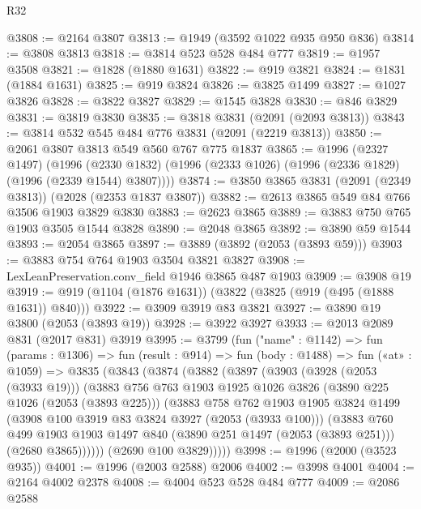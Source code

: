 \begin{lexlean}{R32}
\begin{coremodule}
@3808 := @2164 @3807
@3813 := @1949 (@3592 @1022 @935 @950 @836)
@3814 := @3808 @3813
@3818 := @3814 @523 @528 @484 @777
@3819 := @1957 @3508
@3821 := @1828 (@1880 @1631)
@3822 := @919 @3821
@3824 := @1831 (@1884 @1631)
@3825 := @919 @3824
@3826 := @3825 @1499
@3827 := @1027 @3826
@3828 := @3822 @3827
@3829 := @1545 @3828
@3830 := @846 @3829
@3831 := @3819 @3830
@3835 := @3818 @3831 (@2091 (@2093 @3813))
@3843 := @3814 @532 @545 @484 @776 @3831 (@2091 (@2219 @3813))
@3850 := @2061 @3807 @3813 @549 @560 @767 @775 @1837
@3865 := @1996
    (@2327 @1497)
    (@1996 (@2330 @1832) (@1996 (@2333 @1026) (@1996 (@2336 @1829) (@1996 (@2339 @1544) @3807))))
@3874 := @3850 @3865 @3831 (@2091 (@2349 @3813)) (@2028 (@2353 @1837 @3807))
@3882 := @2613 @3865 @549 @84 @766 @3506 @1903 @3829 @3830
@3883 := @2623 @3865
@3889 := @3883 @750 @765 @1903 @3505 @1544 @3828
@3890 := @2048 @3865
@3892 := @3890 @59 @1544
@3893 := @2054 @3865
@3897 := @3889 (@3892 (@2053 (@3893 @59)))
@3903 := @3883 @754 @764 @1903 @3504 @3821 @3827
@3908 := LexLeanPreservation.conv_field @1946 @3865 @487 @1903
@3909 := @3908 @19
@3919 := @919 (@1104 (@1876 @1631)) (@3822 (@3825 (@919 (@495 (@1888 @1631)) @840)))
@3922 := @3909 @3919 @83 @3821
@3927 := @3890 @19 @3800 (@2053 (@3893 @19))
@3928 := @3922 @3927
@3933 := @2013 @2089 @831 (@2017 @831) @3919
@3995 := @3799
    (fun ("name" : @1142) =>
    fun (params : @1306) =>
    fun (result : @914) =>
    fun (body : @1488) =>
    fun («at» : @1059) =>
    @3835
      (@3843
        (@3874
          (@3882
            (@3897
              (@3903
                (@3928 (@2053 (@3933 @19)))
                (@3883
                  @756
                  @763
                  @1903
                  @1925
                  @1026
                  @3826
                  (@3890 @225 @1026 (@2053 (@3893 @225)))
                  (@3883
                    @758
                    @762
                    @1903
                    @1905
                    @3824
                    @1499
                    (@3908 @100 @3919 @83 @3824 @3927 (@2053 (@3933 @100)))
                    (@3883
                      @760
                      @499
                      @1903
                      @1903
                      @1497
                      @840
                      (@3890 @251 @1497 (@2053 (@3893 @251)))
                      (@2680 @3865))))))
            (@2690 @100 @3829)))))
@3998 := @1996 (@2000 (@3523 @935))
@4001 := @1996 (@2003 @2588) @2006
@4002 := @3998 @4001
@4004 := @2164 @4002 @2378
@4008 := @4004 @523 @528 @484 @777
@4009 := @2086 @2588

\end{coremodule}
\end{lexlean}
